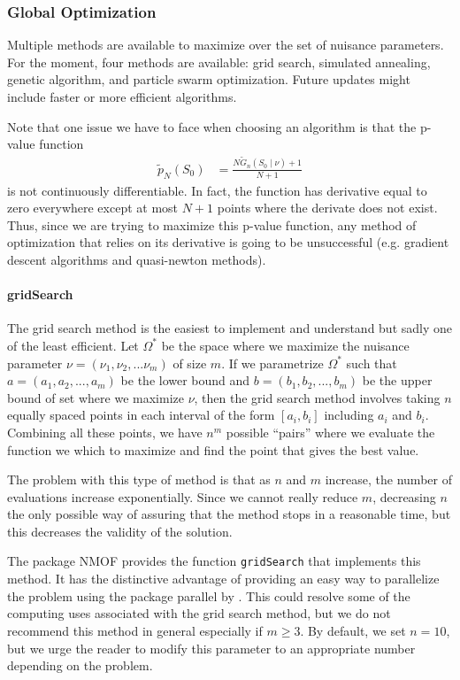 \documentclass[11pt]{article}\usepackage[]{graphicx}\usepackage[]{color}
\newcommand{\pkg}[1]{{\normalfont\fontseries{b}\selectfont #1}}
\let\code=\texttt
\begin{document}
\subsubsection{Global Optimization}

Multiple methods are available to maximize over the set of nuisance parameters. For the moment, four methods are available: grid search, simulated annealing, genetic algorithm, and particle swarm optimization. Future updates might include faster or more efficient algorithms.

Note that one issue we have to face when choosing an algorithm is that the p-value function
	\begin{align}
		\tilde{p}_{N}(S_{0}) & =\frac{N\tilde{G}_{n}(S_{0} \mid \nu)+1}{N+1}
	\end{align}
	is not continuously differentiable. In fact, the function has derivative equal to zero everywhere except at most $N+1$ points where the derivate does not exist. Thus, since we are trying to maximize this p-value function, any method of optimization that relies on its derivative is going to be unsuccessful (e.g. gradient descent algorithms and quasi-newton methods).

	\paragraph{gridSearch}

	The grid search method is the easiest to implement and understand but sadly one of the least efficient. Let $\Omega^*$ be the space where we maximize the nuisance parameter $\nu=(\nu_1,\nu_2,...\nu_m)$ of size $m$. If we parametrize $\Omega^*$ such that $a=(a_1,a_2,...,a_m)$ be the lower bound and $b=(b_1,b_2,...,b_m)$ be the upper bound of set where we maximize $\nu$, then the grid search method involves taking $n$ equally spaced points in each interval of the form $[a_i,b_i]$ including $a_i$ and $b_i$. Combining all these points, we have $n^m$ possible ``pairs'' where we evaluate the function we which to maximize and find the point that gives the best value.

	The problem with this type of method is that as $n$ and $m$ increase, the number of evaluations increase exponentially. Since we cannot really reduce $m$, decreasing $n$ the only possible way of assuring that the method stops in a reasonable time, but this decreases the validity of the solution.

	The package \pkg{NMOF} \citep{gilli_numerical_2011} provides the function \code{gridSearch} that implements this method. It has the distinctive advantage of providing an easy way to parallelize the problem using the package \pkg{parallel} by \cite{r_core_team_r:_2016}. This could resolve some of the computing uses associated with the grid search method, but we do not recommend this method in general especially if $m\geq3$. By default, we set $n=10$, but we urge the reader to modify this parameter to an appropriate number depending on the problem.
\end{document}
